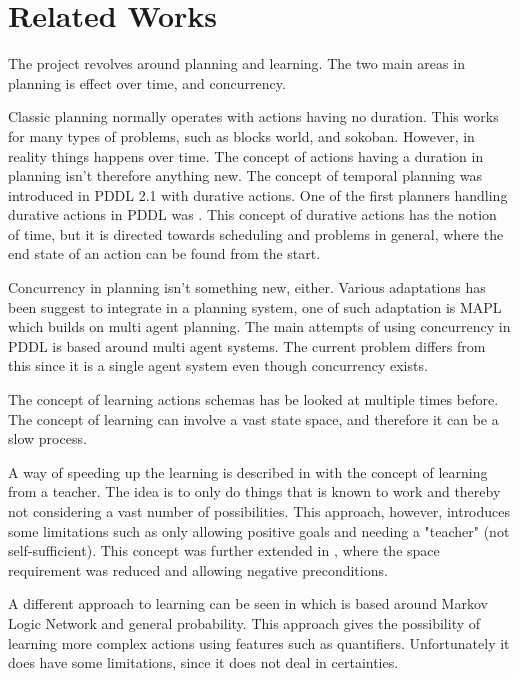\section{Related Works}
The project revolves around planning and learning. The two main areas in planning is effect over time, and concurrency. 

Classic planning normally operates with actions having no duration. This works for many types of problems, such as blocks world, and sokoban. However, in reality things happens over time. The concept of actions having a duration in planning isn't therefore anything new. The concept of temporal planning was introduced in PDDL 2.1 with durative actions. One of the first planners handling durative actions in PDDL was \cite{durative}. This concept of durative actions has the notion of time, but it is directed towards scheduling and problems in general, where the end state of an action can be found from the start.
%
%	
%
%	
%	



Concurrency in planning isn't something new, either. Various adaptations  has been suggest to integrate in a planning system, one of such adaptation is MAPL which builds on multi agent planning\cite{mapl}. The main attempts of using concurrency in PDDL is based around multi agent systems. The current problem differs from this since it is a single agent system even though concurrency exists. 

The concept of learning actions schemas has be looked at multiple times before. The concept of learning can involve a vast state space, and therefore it can be a slow process. 

A way of speeding up the learning is described in \cite{Action-Schemas} with the concept of learning from a teacher. The idea is to only do things that is known to work and thereby not considering a vast number of possibilities. This approach, however, introduces some limitations such as only allowing positive goals and needing a "teacher" (not self-sufficient). This concept was further extended in \cite{jacobsen2015a}, where the space requirement was reduced and allowing negative preconditions.

A different approach to learning can be seen in \cite{zhuo2010a} which is based around Markov Logic Network and general probability. This approach gives the possibility of learning more complex actions using features such as quantifiers. Unfortunately it does have some limitations, since it does not deal in certainties.
